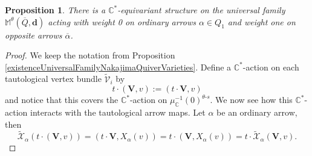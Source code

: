 \documentclass{amsart}
\theoremstyle{plain}
\newtheorem{proposition}[theorem]{Proposition}
\numberwithin{equation}{section}
\theoremstyle{definition}
\theoremstyle{remark}
\begin{document}
	\begin{proposition}\label{equivariantStructureUniversalFamily}
		There is a $\mathbb{C}^*$-equivariant structure on the universal family $\mathbb{M}^{\theta}(\overline{Q},\mathbf{d})$ acting with weight 0 on ordinary arrows
		$\alpha\in Q_1$ and weight one on opposite arrows $\overline\alpha$. 
	\end{proposition}
	\begin{proof}
		We keep the notation from Proposition \ref{existenceUniversalFamilyNakajimaQuiverVarieties}. Define a $\mathbb C^*$-action on each tautological vertex bundle $\widetilde{\mathcal{V}}_i$ by
		$$
		t\cdot(\mathbf{V},v):=(t\cdot \mathbf{V},v)
		$$
		and notice that this covers the $\mathbb C^*$-action on $\mu_{\mathbb{C}}^{-1}(0)^{\theta\text{-}s}$. We now see how this $\mathbb{C}^*$-action interacts with the tautological arrow maps. Let
		$\alpha$ be an ordinary arrow, then
		\begin{equation}\label{equivarianceArrowsBeforeDescending}
			\widetilde{\mathcal{X}}_\alpha(t\cdot(\mathbf{V},v))=(t\cdot\mathbf{V},X_{\alpha}(v))=t\cdot(\mathbf{V},X_{\alpha}(v))=t\cdot \widetilde{\mathcal{X}}_{\alpha}(\mathbf{V},v).
		\end{equation}
		

\end{proof}
\end{document}
